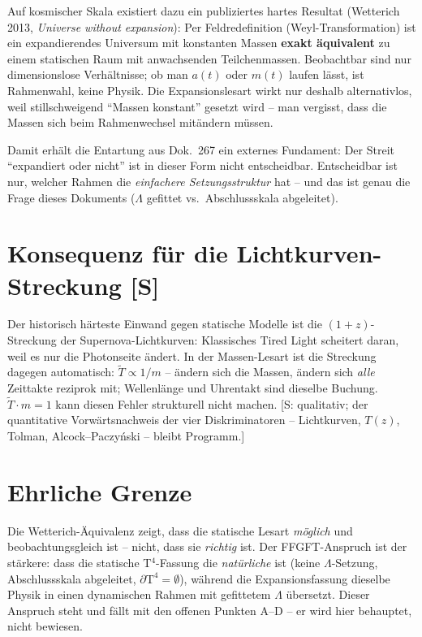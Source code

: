 \documentclass[11pt]{report}
\begin{document}
Auf kosmischer Skala existiert dazu ein publiziertes hartes
Resultat (Wetterich 2013, \emph{Universe without expansion}): Per
Feldredefinition (Weyl-Transformation) ist ein expandierendes
Universum mit konstanten Massen \textbf{exakt äquivalent} zu einem
statischen Raum mit anwachsenden Teilchenmassen. Beobachtbar sind
nur dimensionslose Verhältnisse; ob man $a(t)$ oder $m(t)$ laufen
lässt, ist Rahmenwahl, keine Physik. Die Expansionslesart wirkt nur
deshalb alternativlos, weil stillschweigend \enquote{Massen
konstant} gesetzt wird -- man vergisst, dass die Massen sich beim
Rahmenwechsel mitändern müssen.

Damit erhält die Entartung aus Dok.~267 ein externes Fundament:
Der Streit \enquote{expandiert oder nicht} ist in dieser Form nicht
entscheidbar. Entscheidbar ist nur, welcher Rahmen die
\emph{einfachere Setzungsstruktur} hat -- und das ist genau die
Frage dieses Dokuments ($\Lambda$ gefittet vs.\ Abschlussskala
abgeleitet).

\section{Konsequenz für die Lichtkurven-Streckung [S]}

Der historisch härteste Einwand gegen statische Modelle ist die
$(1+z)$-Streckung der Supernova-Lichtkurven: Klassisches
Tired Light scheitert daran, weil es nur die Photonseite ändert.
In der Massen-Lesart ist die Streckung dagegen automatisch:
$\tilde T \propto 1/m$ -- ändern sich die Massen, ändern sich
\emph{alle} Zeittakte reziprok mit; Wellenlänge und Uhrentakt sind
dieselbe Buchung. $\tilde T \cdot m = 1$ kann diesen Fehler
strukturell nicht machen. [S: qualitativ; der quantitative
Vorwärtsnachweis der vier Diskriminatoren -- Lichtkurven, $T(z)$,
Tolman, Alcock--Paczyński -- bleibt Programm.]

\section{Ehrliche Grenze}

Die Wetterich-Äquivalenz zeigt, dass die statische Lesart
\emph{möglich} und beobachtungsgleich ist -- nicht, dass sie
\emph{richtig} ist. Der FFGFT-Anspruch ist der stärkere: dass die
statische T$^4$-Fassung die \emph{natürliche} ist (keine
$\Lambda$-Setzung, Abschlussskala abgeleitet,
$\partial\text{T}^4 = \emptyset$), während die Expansionsfassung
dieselbe Physik in einen dynamischen Rahmen mit gefittetem
$\Lambda$ übersetzt. Dieser Anspruch steht und fällt mit den
offenen Punkten A--D -- er wird hier behauptet, nicht bewiesen.
\end{document}
